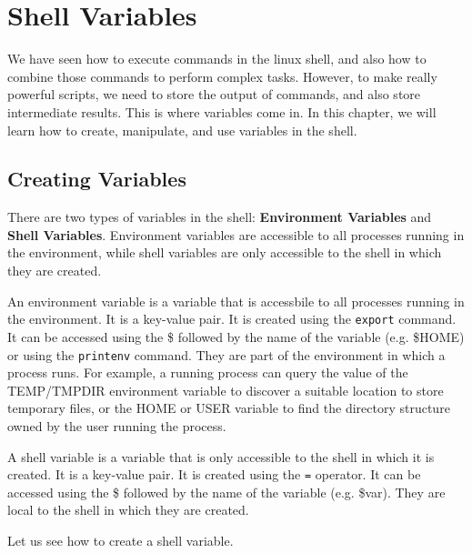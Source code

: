 \setchapterpreamble[u]{\margintoc}
\chapter{Shell Variables}

We have seen how to execute commands in the linux shell, and also how to
combine those commands to perform complex tasks. However, to make really
powerful scripts, we need to store the output of commands, and also store
intermediate results. This is where variables come in. In this chapter,
we will learn how to create, manipulate, and use variables in the shell.

\section{Creating Variables}

There are two types of variables in the shell: \textbf{Environment Variables}
and \textbf{Shell Variables}. Environment variables are accessible to all
processes running in the environment, while shell variables are only accessible
to the shell in which they are created.

\begin{definition}
  An environment variable is a variable that is accessbile to all
  processes running in the environment. It is a key-value pair.
  It is created using the \lstinline{export} command. It can be accessed
  using the \$ followed by the name of the variable (e.g. \$HOME) or
  using the \lstinline{printenv} command.
  They are part of the environment in which a process runs. For example,
  a running process can query the value of the
  TEMP/TMPDIR environment variable to discover a suitable location to store
  temporary files, or the HOME or USER variable
  to find the directory structure owned by the user running the process.
\end{definition}

\begin{definition}
  A shell variable is a variable that is only accessible to the shell
  in which it is created. It is a key-value pair. It is created using
  the \lstinline{=} operator. It can be accessed using the \$ followed by the name
  of the variable (e.g. \$var).
  They are local to the shell in which they are created.
\end{definition}

Let us see how to create a shell variable.

